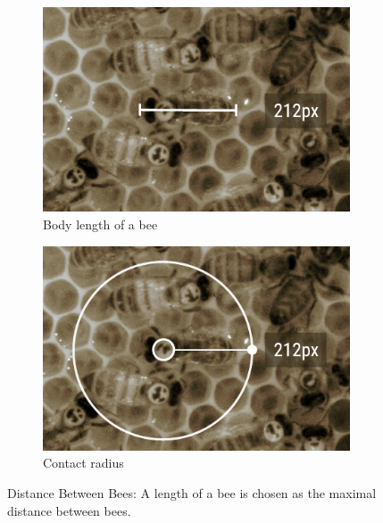 \begin{figure}[htb]
	\centering
	\begin{subfigure}[b]{0.45\textwidth}
		\includegraphics[width=\textwidth]{Figures/sizeTagBee}
		\caption[Body length of a bee]{Body length of a bee}
		\label{fig:size}
	\end{subfigure}
	\hspace{0.08\textwidth}
	\begin{subfigure}[b]{0.45\textwidth}
		\centering
		\includegraphics[width=\textwidth]{Figures/radius}
		\caption[Contact radius]{Contact radius}
		\label{fig:radius}
	\end{subfigure}
	\caption{Distance Between Bees: A length of a bee is chosen as the maximal  distance between bees.}
	\label{fig:contactRadius}
\end{figure}